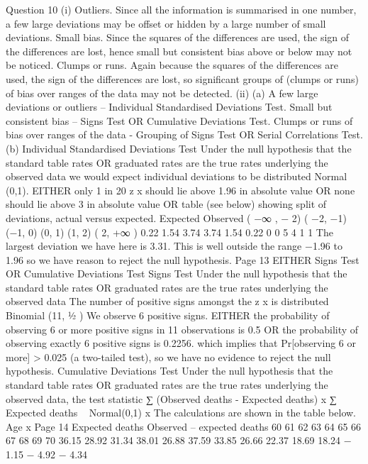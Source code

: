 \documentclass[a4paper,12pt]{article}
\begin{document}
\begin{enumerate}
Question 10
(i)
Outliers. Since all the information is summarised in one number, a few large
deviations may be offset or hidden by a large number of small deviations.
Small bias. Since the squares of the differences are used, the sign of the differences
are lost, hence small but consistent bias above or below may not be noticed.
Clumps or runs. Again because the squares of the differences are used, the sign of the
differences are lost, so significant groups of (clumps or runs) of bias over ranges of
the data may not be detected.
(ii)
(a)
A few large deviations or outliers – Individual Standardised Deviations Test.
Small but consistent bias – Signs Test OR Cumulative Deviations Test.
Clumps or runs of bias over ranges of the data - Grouping of Signs Test OR
Serial Correlations Test.
(b)
Individual Standardised Deviations Test
Under the null hypothesis that the standard table rates OR graduated
rates are the true rates underlying the observed data
we would expect individual deviations to be distributed Normal (0,1).
EITHER only 1 in 20 z x should lie above 1.96 in absolute value
OR none should lie above 3 in absolute value
OR table (see below) showing split of deviations, actual versus expected.
Expected
Observed
( −∞ , − 2) ( −2, −1) (−1, 0) (0, 1) (1, 2) ( 2, +∞ )
0.22
1.54 3.74 3.74 1.54
0.22
0
0
5
4
1
1
The largest deviation we have here is 3.31.
This is well outside the range −1.96 to 1.96 so we have reason to reject the
null hypothesis.
Page 13%
EITHER Signs Test OR Cumulative Deviations Test
Signs Test
Under the null hypothesis that the standard table rates OR graduated
rates are the true rates underlying the observed data
The number of positive signs amongst the z x is distributed Binomial (11, 1⁄2 )
We observe 6 positive signs.
EITHER the probability of observing 6 or more positive signs in 11
observations is 0.5
OR the probability of observing exactly 6 positive signs is 0.2256.
which implies that Pr[observing 6 or more] > 0.025 (a two-tailed test),
so we have no evidence to reject the null hypothesis.
Cumulative Deviations Test
Under the null hypothesis that the standard table rates OR graduated
rates are the true rates underlying the observed data,
the test statistic
∑ (Observed deaths - Expected deaths)
x
∑ Expected deaths
~ Normal(0,1)
x
The calculations are shown in the table below.
Age x
Page 14
Expected deaths
Observed – expected
deaths
60
61
62
63
64
65
66
67
68
69
70 36.15
28.92
31.34
38.01
26.88
37.59
33.85
26.66
22.37
18.69
18.24 − 1.15
− 4.92
− 4.34

\end{enumerate}
\end{document}
